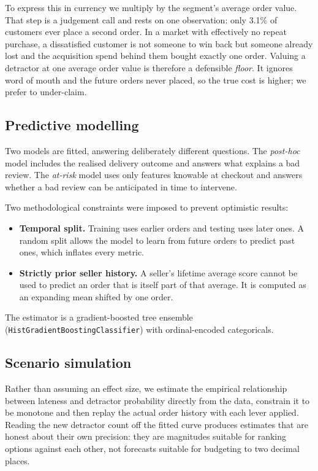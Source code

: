 \documentclass[11pt,a4paper]{article}
\begin{document}
To express this in currency we multiply by the segment's average order value. That
step is a judgement call and rests on one observation: only 3.1\% of customers ever
place a second order. In a market with effectively no repeat purchase, a
dissatisfied customer is not someone to win back but someone already lost and the
acquisition spend behind them bought exactly one order. Valuing a detractor at one
average order value is therefore a defensible \emph{floor}. It ignores word of
mouth and the future orders never placed, so the true cost is higher; we prefer to
under-claim.

\subsection{Predictive modelling}

Two models are fitted, answering deliberately different questions. The
\emph{post-hoc} model includes the realised delivery outcome and answers what
explains a bad review. The \emph{at-risk} model uses only features knowable at
checkout and answers whether a bad review can be anticipated in time to intervene.

Two methodological constraints were imposed to prevent optimistic results:

\begin{itemize}[leftmargin=*,itemsep=0.3em]
  \item \textbf{Temporal split.} Training uses earlier orders and testing uses
        later ones. A random split allows the model to learn from future orders to
        predict past ones, which inflates every metric.
  \item \textbf{Strictly prior seller history.} A seller's lifetime average score
        cannot be used to predict an order that is itself part of that average. It
        is computed as an expanding mean shifted by one order.
\end{itemize}

The estimator is a gradient-boosted tree ensemble
(\texttt{HistGradientBoostingClassifier}) with ordinal-encoded categoricals.

\subsection{Scenario simulation}

Rather than assuming an effect size, we estimate the empirical relationship between
lateness and detractor probability directly from the data, constrain it to be
monotone and then replay the actual order history with each lever applied. Reading
the new detractor count off the fitted curve produces estimates that are honest
about their own precision: they are magnitudes suitable for ranking options against
each other, not forecasts suitable for budgeting to two decimal places.
\end{document}
